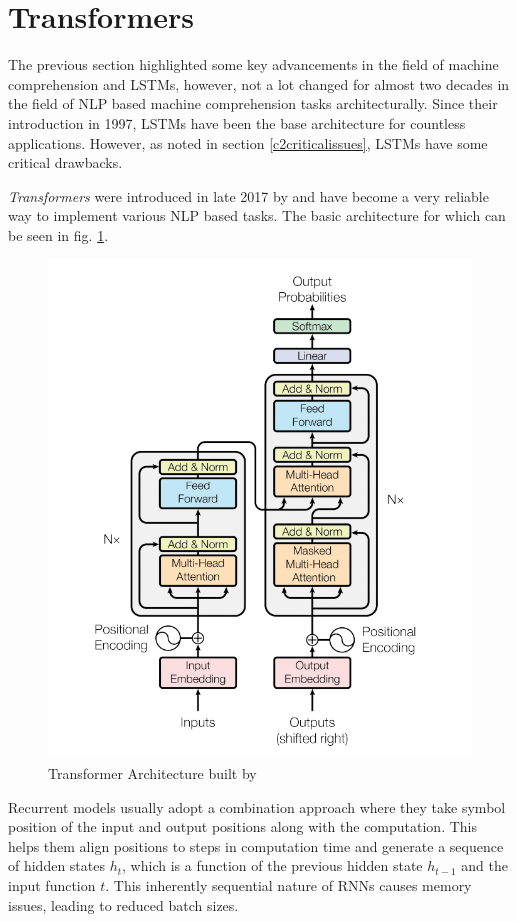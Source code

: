 \documentclass[a4paper,12pt]{report}
\begin{document}
	    \section{Transformers}\label{23}

	    	The previous section highlighted some key advancements in the field of machine comprehension and LSTMs, however, not a lot changed for almost two decades in the field of NLP based machine comprehension tasks architecturally. Since their introduction in 1997, LSTMs \citep{lstmoriginal} have been the base architecture for countless applications. However, as noted in section \ref{c2criticalissues}, LSTMs have some critical drawbacks.

			\textit{Transformers} were introduced in late 2017 by \citep{atayl} and have become a very reliable way to implement various NLP based tasks. The basic architecture for which can be seen in fig. \ref{transformerArchitecture}.
			\begin{figure}[h!]
				\centering
				\includegraphics[scale=0.4]{../images/transformer.png}
				\caption{Transformer Architecture built by \citep{atayl}}\label{transformerArchitecture}
			\end{figure}
	        Recurrent models usually adopt a combination approach where they take symbol position of the input and output positions along with the computation. This helps them align positions to steps in computation time and generate a sequence of hidden states $ h_{t} $, which is a function of the previous hidden state $ h_{t-1}$ and the input function $ t $.  This inherently sequential nature of RNNs causes memory issues, leading to reduced batch sizes.
\end{document}
